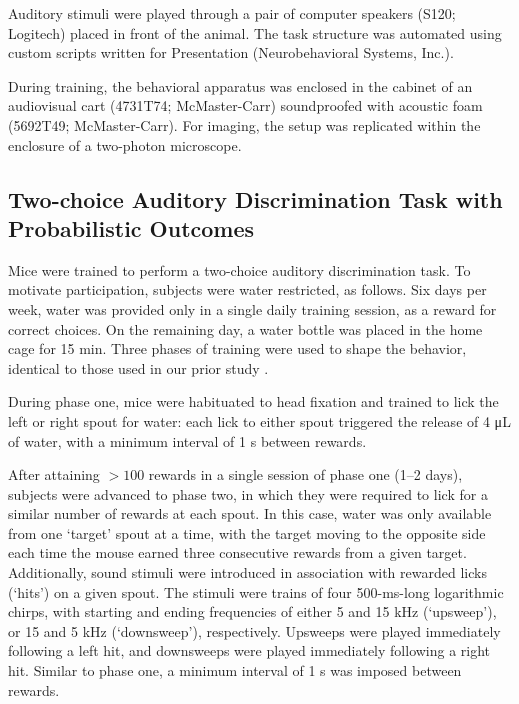 Auditory stimuli were played through a pair of computer speakers (S120; Logitech) placed in front of the animal. The task structure was automated using custom scripts written for Presentation (Neurobehavioral Systems, Inc.). 

During training, the behavioral apparatus was enclosed in the cabinet of an audiovisual cart (4731T74; McMaster-Carr) soundproofed with acoustic foam (5692T49; McMaster-Carr). For imaging, the setup was replicated within the enclosure of a two-photon microscope.

\subsection*{Two-choice Auditory Discrimination Task with Probabilistic Outcomes}
Mice were trained to perform a two-choice auditory discrimination task. To motivate participation, subjects were water restricted, as follows. Six days per week, water was provided only in a single daily training session, as a reward for correct choices. On the remaining day, a water bottle was placed in the home cage for 15 min. Three phases of training were used to shape the behavior, identical to those used in our prior study \citep{siniscalchi2016fast}. 

During phase one, mice were habituated to head fixation and trained to lick the left or right spout for water: each lick to either spout triggered the release of 4 \si{\uL} of water, with a minimum interval of 1 s between rewards. 

After attaining $>100$ rewards in a single session of phase one (1–2 days), subjects were advanced to phase two, in which they were required to lick for a similar number of rewards at each spout. In this case, water was only available from one ‘target’ spout at a time, with the target moving to the opposite side each time the mouse earned three consecutive rewards from a given target. Additionally, sound stimuli were introduced in association with rewarded licks (‘hits’) on a given spout. The stimuli were trains of four 500-ms-long logarithmic chirps, with starting and ending frequencies of either 5 and 15 kHz (‘upsweep’), or 15 and 5 kHz (‘downsweep’), respectively. Upsweeps were played immediately following a left hit, and downsweeps were played immediately following a right hit. Similar to phase one, a minimum interval of 1 s was imposed between rewards. 

